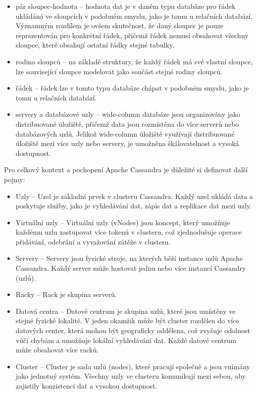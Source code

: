 \documentclass[a4paper, 11pt]{article}
\begin{document}
    \begin{itemize}
        \item pár sloupec-hodnota -- hodnota dat je v daném typu databáze pro řádek ukládáná ve sloupcích v podobném smyslu, jako je tomu u relačních databází. Významným rozdílem je ovšem skutečnost, že daný sloupec je pouze reprezentován pro konkrétní řádek, přičemž řádek nemusí obsahovat všechny sloupce, které obsahují ostatní řádky stejné tabulky.
        \item rodina sloupců -- na základě struktury, že každý řádek má své vlastní sloupce,  lze související sloupce modelovat jako součást stejné rodiny sloupců.
        \item řádek -- řádek lze v tomto typu databáze chápat v podobném smyslu, jako je tomu u relačních databází.
        \item servery a databázové uzly -- wide-column databáze jsou organizovány jako distribuované úložiště, přičemž data jsou rozmístěna do více serverů nebo databázových uzlů. Jelikož wide-column úložiště využívají distribuované úložiště mezi více uzly nebo servery, je umožněna škálovatelnost a vysoká dostupnost.
    \end{itemize}

    Pro celkový kontext a pochopení Apache Cassandra je důležité si definovat další pojmy:

    \begin{itemize}
        \item Uzly -- Uzel je základní prvek v clusteru Cassandra. Každý uzel ukládá data a poskytuje služby, jako je vyhledávání dat, zápis dat a replikace dat mezi uzly.
        \item Virtuální uzly -- Virtuální uzly (vNodes) jsou koncept, který umožňuje každému uzlu zastupovat více tokenů v clusteru, což zjednodušuje operace přidávání, odebrání a vyvažování zátěže v clusteru.
        \item Servery -- Servery jsou fyzické stroje, na kterých běží instance uzlů Apache Cassandra. Každý server může hostovat jednu nebo více instancí Cassandry (uzlů).
        \item Racky -- Rack je skupina serverů.
        \item Datová centra -- Datové centrum je skupina uzlů, které jsou umístěny ve stejné fyzické lokalitě. V jeden okamžik může být cluster rozdělen do více datových center, která mohou být geograficky oddělena, což zvyšuje odolnost vůči chybám a umožňuje lokální vyhledávání dat. Každé datové centrum může obsahovat více racků.
        \item Cluster -- Cluster je sada uzlů (nodes), které pracují společně a jsou vnímány jako jednotný systém. Všechny uzly ve clusteru komunikují mezi sebou, aby zajistily konzistenci dat a vysokou dostupnost.
        
    \end{itemize}
\end{document}
